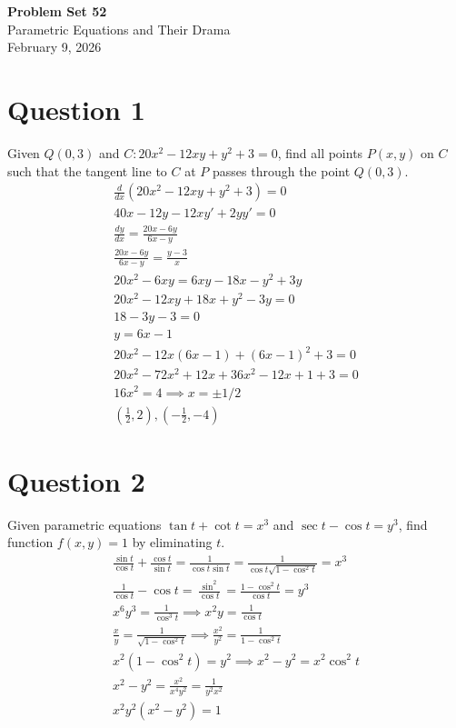 \documentclass[12pt]{article}
\newcommand{\ddx}{\frac{d}{dx}}
\newcommand{\dydx}{\frac{dy}{dx}}
\begin{document}
\vspace*{0cm}

\begin{center}
    {\Large \bfseries Problem Set 52} \\[0.5cm]
    {\large Parametric Equations and Their Drama} \\[0.35cm]
    {\normalsize February 9, 2026}
\end{center}


\section{Question 1}
Given $Q(0,3)$ and $C: 20x^2-12xy+y^2+3=0$, find all points $P(x,y)$ on $C$ such that the tangent line to $C$ at $P$ passes through the point $Q(0,3)$.
\begin{gather*}
   \ddx(20x^2-12xy+y^2+3)=0\\
   40x-12y-12xy'+2yy'=0\\
   \dydx=\frac{20x-6y}{6x-y}\\
    \frac{20x-6y}{6x-y}=\frac{y-3}{x}\\
    20x^2-6xy=6xy-18x-y^2+3y\\
    20x^2-12xy+18x+y^2-3y=0\\
    18-3y-3=0\\
    y=6x-1\\
    20x^2-12x(6x-1)+(6x-1)^2+3=0\\
    20x^2-72x^2+12x+36x^2-12x+1+3=0\\
    16x^2=4\implies x=\pm 1/2\\
    \boxed{(\frac{1}{2},2),(-\frac{1}{2},-4)}
\end{gather*}

\section{Question 2}
Given parametric equations $\tan t+\cot t=x^3$ and $\sec t- \cos t= y^3$, find function $f(x,y)=1$ by eliminating $t$.
\begin{gather*}
    \frac{\sin t}{\cos t}+\frac{\cos t}{\sin t}=\frac{1}{\cos t\sin t}=\frac{1}{\cos t \sqrt{1-\cos^2t}}=x^3\\
    \frac{1}{\cos t}-\cos t = \frac{\sin^2}{\cos t}=\frac{1-\cos^2t}{\cos t}=y^3\\
    x^6y^3=\frac{1}{\cos^3t}\implies x^2y=\frac{1}{\cos t}\\
    \frac{x}{y}=\frac{1}{\sqrt{1-\cos^2t}}\implies \frac{x^2}{y^2}=\frac{1}{1-\cos^2t}\\
    x^2(1-\cos^2t)=y^2\implies x^2-y^2=x^2\cos^2t\\
    x^2-y^2=\frac{x^2}{x^4y^2}=\frac{1}{y^2x^2}\\
    \boxed{x^2y^2(x^2-y^2)=1}
\end{gather*}
\end{document}
